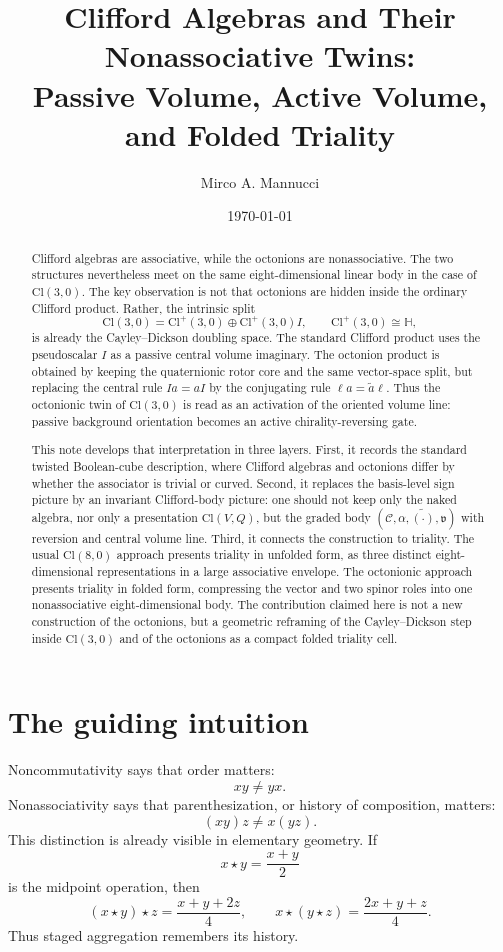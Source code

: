 \documentclass[11pt]{article}
\title{Clifford Algebras and Their Nonassociative Twins:\\
Passive Volume, Active Volume, and Folded Triality}
\author{Mirco A. Mannucci}
\date{\today}
\newcommand{\Cl}{\mathrm{Cl}}
\begin{document}
\maketitle

\begin{abstract}
Clifford algebras are associative, while the octonions are nonassociative.
The two structures nevertheless meet on the same eight-dimensional linear
body in the case of $\Cl(3,0)$. The key observation is not that octonions are
hidden inside the ordinary Clifford product. Rather, the intrinsic split
\[
\Cl(3,0)=\Cl^+(3,0)\oplus \Cl^+(3,0)I,
\qquad
\Cl^+(3,0)\cong\mathbb H,
\]
is already the Cayley--Dickson doubling space. The standard Clifford product
uses the pseudoscalar $I$ as a passive central volume imaginary. The octonion
product is obtained by keeping the quaternionic rotor core and the same
vector-space split, but replacing the central rule $Ia=aI$ by the conjugating
rule $\ell a=\widetilde a\ell$. Thus the octonionic twin of $\Cl(3,0)$ is
read as an activation of the oriented volume line: passive background
orientation becomes an active chirality-reversing gate.

This note develops that interpretation in three layers. First, it records the
standard twisted Boolean-cube description, where Clifford algebras and
octonions differ by whether the associator is trivial or curved. Second, it
replaces the basis-level sign picture by an invariant Clifford-body picture:
one should not keep only the naked algebra, nor only a presentation
$\Cl(V,Q)$, but the graded body $(\mathcal C,\alpha,\widetilde{(\cdot)},\mathfrak v)$
with reversion and central volume line. Third, it connects the construction to
triality. The usual $\Cl(8,0)$ approach presents triality in unfolded form, as
three distinct eight-dimensional representations in a large associative
envelope. The octonionic approach presents triality in folded form, compressing
the vector and two spinor roles into one nonassociative eight-dimensional body.
The contribution claimed here is not a new construction of the octonions, but
a geometric reframing of the Cayley--Dickson step inside $\Cl(3,0)$ and of the
octonions as a compact folded triality cell.
\end{abstract}

\section{The guiding intuition}

Noncommutativity says that order matters:
\[
xy \neq yx.
\]
Nonassociativity says that parenthesization, or history of composition,
matters:
\[
(xy)z \neq x(yz).
\]
This distinction is already visible in elementary geometry. If
\[
x\star y = \frac{x+y}{2}
\]
is the midpoint operation, then
\[
(x\star y)\star z = \frac{x+y+2z}{4},
\qquad
x\star(y\star z) = \frac{2x+y+z}{4}.
\]
Thus staged aggregation remembers its history.
\end{document}
